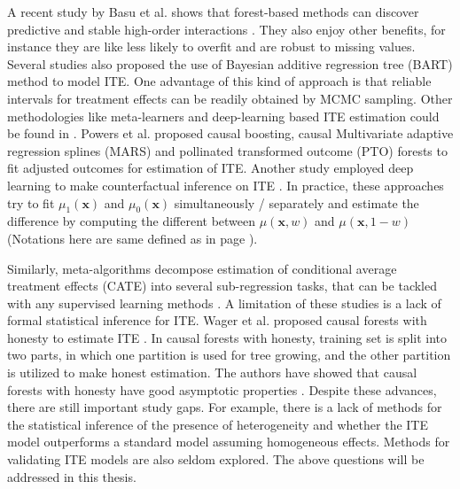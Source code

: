     A recent study by Basu et al. shows that forest-based methods can discover predictive and stable high-order interactions \cite{basu2018iterative}. They also enjoy other benefits, for instance they are like less likely to overfit and are robust to missing values. Several studies \cite{green2012modeling,hill2011bayesian, hill2013assessing}  also proposed the use of Bayesian additive regression tree (BART) method \cite{chipman2010bart} to model ITE. One advantage of this kind of approach is that reliable intervals for treatment effects can be readily obtained by MCMC sampling. Other methodologies like meta-learners and deep-learning based ITE estimation could be found in \cite{kunzel2019metalearners,johansson2016learning,powers2017some}. Powers et al. proposed causal boosting, causal Multivariate adaptive regression splines (MARS) and pollinated transformed outcome (PTO) forests to fit adjusted outcomes \cite{powers2017some} for estimation of ITE. Another study employed deep learning to make counterfactual inference on ITE \cite{johansson2016learning}. In practice, these approaches try to fit $\mu_1(\mathbf{x})$ and $\mu_0(\mathbf{x})$ simultaneously / separately and estimate the difference by computing the different between $\mu(\mathbf{x},w)$ and $\mu(\mathbf{x}, 1-w)$ (Notations here are same defined as in page \pageref{chap:sym}).

    Similarly, meta-algorithms decompose estimation of conditional average treatment effects (CATE) into several sub-regression tasks, that can be tackled with any supervised learning methods \cite{kunzel2019metalearners}. A limitation of these studies is a lack of formal statistical inference \cite{wager2018estimation} for ITE. Wager et al. proposed causal forests with honesty to estimate ITE \cite{wager2018estimation}. In causal forests with honesty, training set is split into two parts, in which one partition is used for tree growing, and the other partition is utilized to make honest estimation. The authors have showed that causal forests with honesty have good asymptotic properties \cite{wager2018estimation}.  Despite these advances, there are still important study gaps. For example, there is a lack of methods for the statistical inference of the presence of heterogeneity and whether the ITE model outperforms a standard model assuming homogeneous effects. Methods for validating ITE models are also seldom explored. The above questions will be addressed in this thesis. 
  

